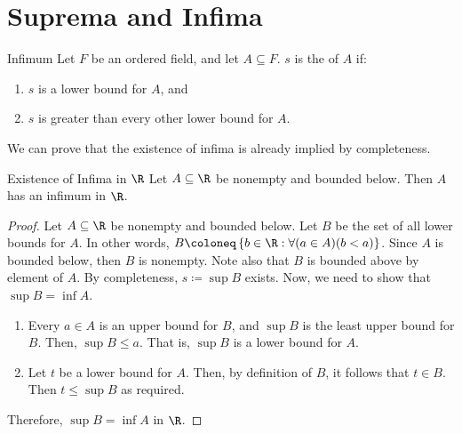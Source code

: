 \chapter{Suprema and Infima}
\begin{dfnbox}{Infimum}{}
    Let $F$ be an ordered field, and let $A \subseteq F$. $s$ is the  of $A$ if:
    \begin{enumerate}[noitemsep]
        \item $s$ is a lower bound for $A$, and
        \item $s$ is greater than every other lower bound for $A$.
    \end{enumerate}
\end{dfnbox}

We can prove that the existence of infima is already implied by completeness.

\begin{thmbox}{Existence of Infima in $\R$}{}
    Let $A \subseteq \R$ be nonempty and bounded below. Then $A$ has an infimum in $\R$.
    \tcblower
    \begin{proof}
        Let $A \subseteq \R$ be nonempty and bounded below. Let $B$ be the set of all lower bounds for $A$. In other words, $B \coloneq \left\{ b \in \R : \forall(a \in A)(b < a) \right\}$. Since $A$ is bounded below, then $B$ is nonempty. Note also that $B$ is bounded above by element of $A$. By completeness, $s \coloneq \sup B$ exists. Now, we need to show that $\sup B = \inf A$.
        \begin{enumerate}
            \item Every $a \in A$ is an upper bound for $B$, and $\sup B$ is the least upper bound for $B$. Then, $\sup B \leq a$. That is, $\sup B$ is a lower bound for $A$.
            \item Let $t$ be a lower bound for $A$. Then, by definition of $B$, it follows that $t \in B$. Then $t \leq \sup B$ as required.
        \end{enumerate}
        Therefore, $\sup B = \inf A$ in $\R$.
    \end{proof}
\end{thmbox}

